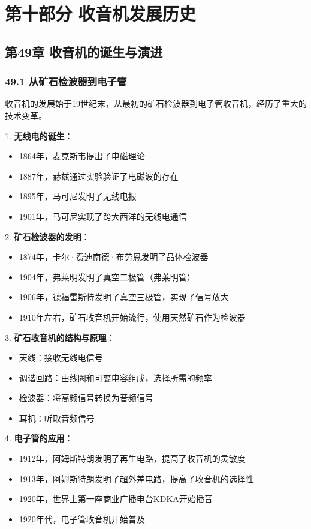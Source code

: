 \documentclass[12pt,UTF8]{ctexbook}
\begin{document}
\part*{第十部分 收音机发展历史}

\chapter*{第49章 收音机的诞生与演进}
\section*{49.1 从矿石检波器到电子管}

收音机的发展始于19世纪末，从最初的矿石检波器到电子管收音机，经历了重大的技术变革。

1. \textbf{无线电的诞生}：
   \begin{itemize}[leftmargin=3.5em]
   \item 1864年，麦克斯韦提出了电磁理论
   \item 1887年，赫兹通过实验验证了电磁波的存在
   \item 1895年，马可尼发明了无线电报
   \item 1901年，马可尼实现了跨大西洋的无线电通信
   \end{itemize}

2. \textbf{矿石检波器的发明}：
   \begin{itemize}[leftmargin=3.5em]
   \item 1874年，卡尔·费迪南德·布劳恩发明了晶体检波器
   \item 1904年，弗莱明发明了真空二极管（弗莱明管）
   \item 1906年，德福雷斯特发明了真空三极管，实现了信号放大
   \item 1910年左右，矿石收音机开始流行，使用天然矿石作为检波器
   \end{itemize}

3. \textbf{矿石收音机的结构与原理}：
   \begin{itemize}[leftmargin=3.5em]
   \item 天线：接收无线电信号
   \item 调谐回路：由线圈和可变电容组成，选择所需的频率
   \item 检波器：将高频信号转换为音频信号
   \item 耳机：听取音频信号
   \end{itemize}

4. \textbf{电子管的应用}：
   \begin{itemize}[leftmargin=3.5em]
   \item 1912年，阿姆斯特朗发明了再生电路，提高了收音机的灵敏度
   \item 1913年，阿姆斯特朗发明了超外差电路，提高了收音机的选择性
   \item 1920年，世界上第一座商业广播电台KDKA开始播音
   \item 1920年代，电子管收音机开始普及
   \end{itemize}
\end{document}
